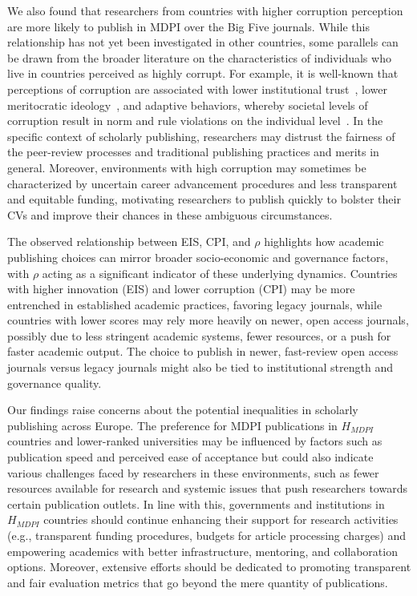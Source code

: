 \documentclass[amsfonts, amssymb, prl, superscriptaddress, notitlepage, twocolumn, nofootinbib]{revtex4-2}
\begin{document}
We also found that researchers from countries with higher corruption perception are more likely to publish in MDPI over the Big Five journals. While this relationship has not yet been investigated in other countries, some parallels can be drawn from the broader literature on the characteristics of individuals who live in countries perceived as highly corrupt. For example, it is well-known that perceptions of corruption are associated with lower institutional trust~\cite{hakhverdian2012}, lower meritocratic ideology~\cite{tan2017}, and adaptive behaviors, whereby societal levels of corruption result in norm and rule violations on the individual level~\cite{kobis2018}. In the specific context of scholarly publishing, researchers may distrust the fairness of the peer-review processes and traditional publishing practices and merits in general. Moreover, environments with high corruption may sometimes be characterized by uncertain career advancement procedures and less transparent and equitable funding, motivating researchers to publish quickly to bolster their CVs and improve their chances in these ambiguous circumstances. 

The observed relationship between EIS, CPI, and $\rho$ highlights how academic publishing choices can mirror broader socio-economic and governance factors, with $\rho$ acting as a significant indicator of these underlying dynamics. Countries with higher innovation (EIS) and lower corruption (CPI) may be more entrenched in established academic practices, favoring legacy journals, while countries with lower scores may rely more heavily on newer, open access journals, possibly due to less stringent academic systems, fewer resources, or a push for faster academic output. The choice to publish in newer, fast-review open access journals versus legacy journals might also be tied to institutional strength and governance quality. 

Our findings raise concerns about the potential inequalities in scholarly publishing across Europe. The preference for MDPI publications in $H_{MDPI}$ countries and lower-ranked universities may be influenced by factors such as publication speed and perceived ease of acceptance but could also indicate various challenges faced by researchers in these environments, such as fewer resources available for research and systemic issues that push researchers towards certain publication outlets. In line with this, governments and institutions in $H_{MDPI}$ countries should continue enhancing their support for research activities (e.g., transparent funding procedures, budgets for article processing charges) and empowering academics with better infrastructure, mentoring, and collaboration options. Moreover, extensive efforts should be dedicated to promoting transparent and fair evaluation metrics that go beyond the mere quantity of publications. 
\end{document}
